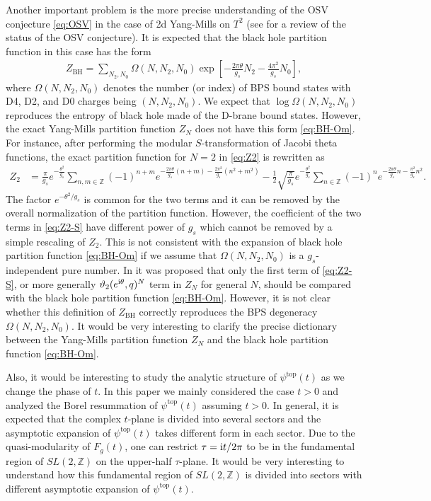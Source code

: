 \documentclass[11pt]{article}
\newcommand{\ri}{{\rm i}}
\def\th{\theta}
\newcommand{\hf}{\frac{1}{2}}
\newcommand{\Om}{\Omega}
\def\rt#1{\sqrt{#1}}
\renewcommand{\[}{\begin{eqnarray}}
\renewcommand{\]}{\end{eqnarray}}
\newcommand{\bbZ}{{\mathbb Z}}
\begin{document}
Another important problem is the more precise understanding of the
OSV conjecture \eqref{eq:OSV} in the case of 2d Yang-Mills on $T^2$
(see  \cite{Guica:2007wd}
for a review of the status of the OSV conjecture).
It is expected that the black hole partition function in this case has the form
\begin{align}
 Z_{\text{BH}}=\sum_{N_2,N_0}\Om(N,N_2,N_0)\exp\left[
-\frac{2\pi\th}{g_s}N_2-\frac{4\pi^2}{g_s}N_0\right],
\label{eq:BH-Om}
\end{align}
where $\Om(N,N_2,N_0)$ denotes the number (or index) of BPS bound states
with D4, D2, and D0 charges being $(N,N_2,N_0)$. 
We expect that $\log\Om(N,N_2,N_0)$ reproduces the entropy of black hole made of the
D-brane bound states.
However, the exact Yang-Mills partition function $Z_N$ does not
have this form \eqref{eq:BH-Om}. For instance, 
after performing the modular $S$-transformation of
Jacobi theta functions, the exact partition function for $N=2$ in \eqref{eq:Z2}
is rewritten as
\begin{equation}
\begin{aligned}
 Z_2&=\frac{\pi}{g_s}e^{-\frac{\th^2}{g_s}}\sum_{n,m\in\bbZ}(-1)^{n+m}e^{-\frac{2\pi\th}{g_s}(n+m)
-\frac{2\pi^2}{g_s}(n^2+m^2)}-\hf\rt{\frac{\pi}{g_s}}e^{-\frac{\th^2}{g_s}}\sum_{n\in\bbZ}
(-1)^n e^{-\frac{2\pi\th}{g_s}n
-\frac{\pi^2}{g_s}n^2}.
\end{aligned} 
\label{eq:Z2-S} 
\end{equation}
The factor $e^{-\th^2/g_s}$ is common for the two terms and it can be removed by the overall
normalization of the partition function. However,  
the coefficient of the two terms in \eqref{eq:Z2-S} have
different power of $g_s$ which cannot be removed by a simple 
rescaling of $Z_2$.
This is not consistent with the expansion of black hole
partition function \eqref{eq:BH-Om} 
if we assume that $\Om(N,N_2,N_0)$ is a $g_s$-independent pure number.
In \cite{Aganagic:2004js,Caporaso:2006kk,Griguolo:2006kp} it was proposed that only the first term of 
\eqref{eq:Z2-S}, or more generally $\vartheta_2(e^{\ri\th},q)^N$ term in $Z_N$
for general $N$, should be compared with the black hole partition function 
\eqref{eq:BH-Om}. However, it is not clear whether this  definition of 
$Z_{\text{BH}}$ correctly reproduces the BPS degeneracy $\Om(N,N_2,N_0)$.
It would be very interesting to clarify the precise dictionary between
the Yang-Mills partition function $Z_N$
and the black hole partition function \eqref{eq:BH-Om}.

Also, it would be interesting to study the analytic structure of $\psi^{\text{top}}(t)$
as we change the phase of $t$. In this paper we mainly considered the case $t>0$
and analyzed the Borel resummation of $\psi^{\text{top}}(t)$ assuming $t>0$.
In general, it is expected that the complex $t$-plane is divided into several sectors
and the asymptotic expansion of $\psi^{\text{top}}(t)$
takes different form in each sector. Due to the quasi-modularity of $F_g(t)$,
one can restrict $\tau=\ri t/2\pi$ to be in the fundamental region of $SL(2,\bbZ)$
on the upper-half $\tau$-plane. It would be very interesting to understand how
this fundamental region of $SL(2,\bbZ)$ is divided into sectors with different asymptotic expansion
of $\psi^{\text{top}}(t)$. 
\end{document}
